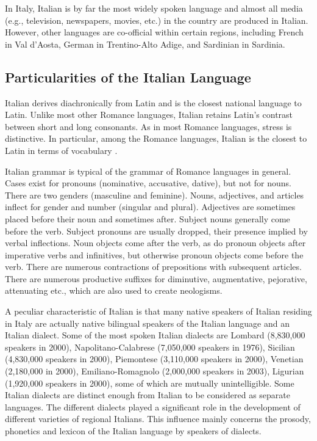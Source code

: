 \documentclass[]{../../metanetpaper}
\begin{document}
\begin{multicols}{2}
In Italy, Italian is by far the most widely spoken language and almost all
media (e.g., television, newspapers, movies, etc.) in the country are produced
in Italian. However, other languages are co-official within certain regions,
including French in Val d'Aosta, German in Trentino-Alto Adige, and Sardinian
in Sardinia.


\subsection{Particularities of the Italian Language}

Italian derives diachronically from Latin and is the closest national language
to Latin. Unlike most other Romance languages, Italian retains Latin's
contrast between short and long consonants. As in most Romance languages,
stress is distinctive. In particular, among the Romance languages, Italian is
the closest to Latin in terms of vocabulary \cite{ethnologue}.

Italian grammar is typical of the grammar of Romance languages in
general. Cases exist for pronouns (nominative, accusative, dative), but not
for nouns. There are two genders (masculine and feminine). Nouns, adjectives,
and articles inflect for gender and number (singular and plural). Adjectives
are sometimes placed before their noun and sometimes after. Subject nouns
generally come before the verb. Subject pronouns are usually dropped, their
presence implied by verbal inflections. Noun objects come after the verb, as
do pronoun objects after imperative verbs and infinitives, but otherwise
pronoun objects come before the verb. There are numerous contractions of
prepositions with subsequent articles. There are numerous productive suffixes
for diminutive, augmentative, pejorative, attenuating etc., which are also
used to create neologisms.



A peculiar characteristic of Italian is that many native speakers of Italian
residing in Italy are actually native bilingual speakers of the Italian
language and an Italian dialect. Some of the most spoken Italian dialects are
Lombard (8,830,000 speakers in 2000), Napolitano-Calabrese (7,050,000 speakers
in 1976), Sicilian (4,830,000 speakers in 2000), Piemontese (3,110,000
speakers in 2000), Venetian (2,180,000 in 2000), Emiliano-Romagnolo (2,000,000
speakers in 2003), Ligurian (1,920,000 speakers in 2000), some of which are
mutually unintelligible. Some Italian dialects are distinct enough from
Italian to be considered as separate languages. The different dialects played
a significant role in the development of different varieties of regional
Italians. This influence mainly concerns the prosody, phonetics and lexicon of
the Italian language by speakers of dialects.






\end{multicols}
\end{document}
